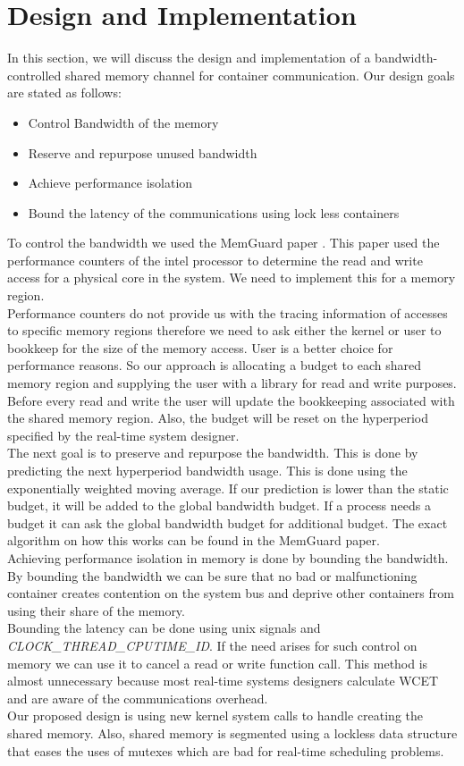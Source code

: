 \documentclass[a4paper, 10pt]{article}
\theoremstyle{nonumberplain}
\begin{document}
\section{Design and Implementation}
In this section, we will discuss the design and implementation of a
bandwidth-controlled shared memory channel for container communication.
Our design goals are stated as follows:
\begin{itemize}
    \item Control Bandwidth of the memory
    \item Reserve and repurpose unused bandwidth
    \item Achieve performance isolation
    \item Bound the latency of the communications using lock less containers
\end{itemize}
To control the bandwidth we used the MemGuard paper \cite{memguard}.
This paper used the performance counters of the intel processor to determine
the read and write access for a physical core in the system. We need to
implement this for a memory region. \\
Performance counters do not provide us with the tracing information of accesses
to specific memory regions therefore we need to ask either the kernel or
user to bookkeep for the size of the memory access. User is a better
choice for performance reasons. So our approach is allocating a budget to each
shared memory region and supplying the user with a library for read and write
purposes. Before every read and write the user will update the bookkeeping
associated with the shared memory region. Also, the budget will be reset on
the hyperperiod specified by the real-time system designer. \\
The next goal is to preserve and repurpose the bandwidth. This is done by
predicting the next hyperperiod bandwidth usage. This is done using
the exponentially weighted moving average. If our prediction is lower than
the static budget, it will be added to the global bandwidth budget. If a process
needs a budget it can ask the global bandwidth budget for additional budget.
The exact algorithm on how this works can be found in the MemGuard \cite{memguard}
paper. \\
Achieving performance isolation in memory is done by bounding the bandwidth.
By bounding the bandwidth we can be sure that no bad or malfunctioning
container creates contention on the system bus and deprive other containers
from using their share of the memory. \\
Bounding the latency can be done using unix signals and
\textit{CLOCK\_THREAD\_CPUTIME\_ID}. If the need arises for such control on
memory we can use it to cancel a read or write function call. This method is
almost unnecessary because most real-time systems designers calculate WCET and
are aware of the communications overhead. \\
Our proposed design is using new kernel system calls to handle creating the
shared memory. Also, shared memory is segmented using a lockless data structure
that eases the uses of mutexes which are bad for real-time scheduling problems.
\end{document}
